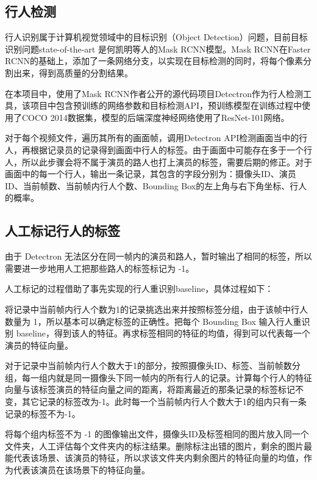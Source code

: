 \subsection{行人检测}
行人识别属于计算机视觉领域中的目标识别（Object Detection）问题，目前目标识别问题state-of-the-art 是何凯明等人的Mask RCNN\cite{he2017mask}模型。Mask RCNN在Faster RCNN\cite{ren2015faster}的基础上，添加了一条网络分支，以实现在目标检测的同时，将每个像素分割出来，得到高质量的分割结果。

在本项目中，使用了Mask RCNN作者公开的源代码项目Detectron\cite{Detectron2018}作为行人检测工具，该项目中包含预训练的网络参数和目标检测API，预训练模型在训练过程中使用了COCO 2014\cite{lin2014microsoft}数据集，模型的后端深度神经网络使用了ResNet-101\cite{he2016deep}网络。

对于每个视频文件，遍历其所有的画面帧，调用Detectron API检测画面当中的行人，再根据记录员的记录得到画面中行人的标签。由于画面中可能存在多于一个行人，所以此步骤会将不属于演员的路人也打上演员的标签，需要后期的修正。对于画面中的每一个行人，输出一条记录，其包含的字段分别为：摄像头ID、演员ID、当前帧数、当前帧内行人个数、Bounding Box的左上角与右下角坐标、行人的概率。

\subsection{人工标记行人的标签}

由于 Detectron 无法区分在同一帧内的演员和路人，暂时输出了相同的标签，所以需要进一步地用人工把那些路人的标签标记为 -1。

人工标记的过程借助了事先实现的行人重识别baseline，具体过程如下：

将记录中当前帧内行人个数为1的记录挑选出来并按照标签分组，由于该帧中行人数量为 1，所以基本可以确定标签的正确性。把每个 Bounding Box 输入行人重识别 baseline，得到该人的特征。再求标签相同的特征的均值，得到可以代表每一个演员的特征向量。

对于记录中当前帧内行人个数大于1的部分，按照摄像头ID、标签、当前帧数分组，每一组内就是同一摄像头下同一帧内的所有行人的记录。计算每个行人的特征向量与该标签演员的特征向量之间的距离，将距离最近的那条记录的标签标记不变，其它记录的标签改为-1。此时每一个当前帧内行人个数大于1的组内只有一条记录的标签不为-1。

将每个组内标签不为 -1 的图像输出文件，摄像头ID及标签相同的图片放入同一个文件夹，人工评估每个文件夹内的标注结果。删除标注出错的图片，剩余的图片最能代表该场景、该演员的特征，所以求该文件夹内剩余图片的特征向量的均值，作为代表该演员在该场景下的特征向量。


